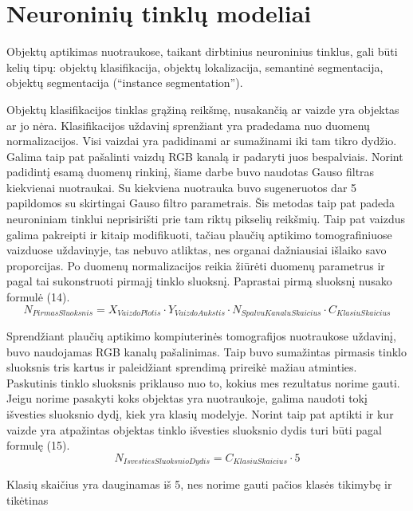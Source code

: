 \documentclass{VUMIFInfKursinis}
\begin{document}
\section{Neuroninių tinklų modeliai}
\par
Objektų aptikimas nuotraukose, taikant dirbtinius neuroninius tinklus, gali būti kelių
tipų: objektų klasifikacija, objektų lokalizacija, semantinė segmentacija,
objektų segmentacija (\enquote{instance segmentation}).
 \par
 Objektų klasifikacijos tinklas grąžiną reikšmę, nusakančią ar vaizde yra objektas
 ar jo nėra. Klasifikacijos uždavinį sprenžiant yra pradedama nuo duomenų normalizacijos.
 Visi vaizdai yra padidinami ar sumažinami iki tam tikro dydžio. Galima taip pat pašalinti
 vaizdų RGB kanalą ir padaryti juos bespalviais. Norint padidintį esamą duomenų rinkinį, šiame
 darbe buvo naudotas Gauso filtras kiekvienai nuotraukai. Su kiekviena nuotrauka buvo sugeneruotos dar
 5 papildomos su skirtingai Gauso filtro parametrais. Šis metodas taip pat padeda neuroniniam
 tinklui neprisirišti prie tam riktų pikselių reikšmių. Taip pat vaizdus galima pakreipti ir kitaip
 modifikuoti, tačiau plaučių aptikimo tomografiniuose vaizduose uždavinyje, tas nebuvo
 atliktas, nes organai dažniausiai išlaiko savo proporcijas. Po duomenų normalizacijos reikia
 žiūrėti duomenų parametrus ir pagal tai sukonstruoti pirmajį tinklo sluoksnį. Paprastai pirmą sluoksnį
 nusako formulė (14).
\begin{equation}
N_{PirmasSluoksnis} = X_{VaizdoPlotis} \cdot Y_{VaizdoAukstis} \cdot N_{SpalvuKanaluSkaicius} \cdot C_{KlasiuSkaicius}
\end{equation}
 \par
Sprendžiant plaučių aptikimo kompiuterinės tomografijos nuotraukose uždavinį, buvo naudojamas
RGB kanalų pašalinimas. Taip buvo sumažintas pirmasis tinklo sluoksnis tris kartus ir paleidžiant
sprendimą prireikė mažiau atminties. Paskutinis tinklo sluoksnis priklauso nuo to, kokius mes
rezultatus norime gauti. Jeigu norime pasakyti koks objektas yra nuotraukoje, galima naudoti
tokį išvesties sluoksnio dydį, kiek yra klasių modelyje. Norint taip pat aptikti ir kur
vaizde yra atpažintas objektas tinklo išvesties sluoksnio dydis turi būti pagal formulę (15).
\begin{equation}
  N_{IsvestiesSluoksnioDydis} = C_{KlasiuSkaicius} \cdot 5
\end{equation}
\par
Klasių skaičius yra dauginamas iš 5, nes norime gauti pačios klasės tikimybę ir tikėtinas
\end{document}

